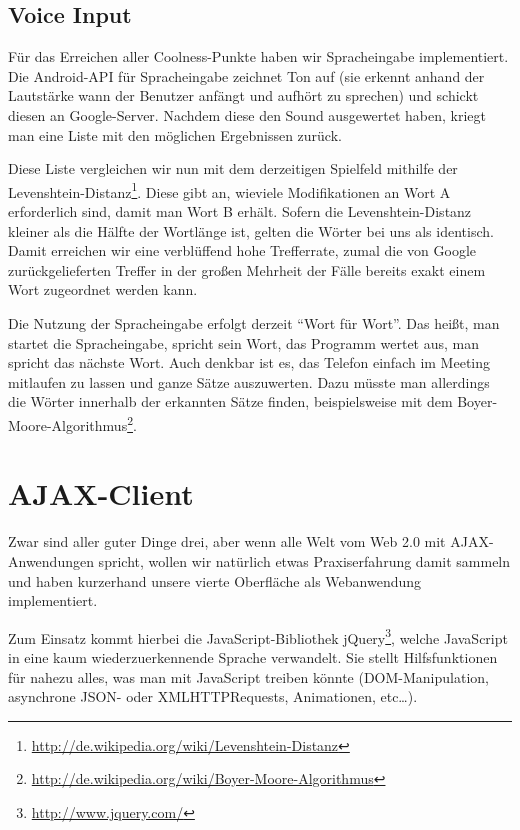 \documentclass[12pt, a4paper]{scrartcl}
\begin{document}
\subsection{Voice Input}

Für das Erreichen aller Coolness-Punkte haben wir Spracheingabe implementiert.
Die Android-API für Spracheingabe zeichnet Ton auf (sie erkennt anhand der
Lautstärke wann der Benutzer anfängt und aufhört zu sprechen) und schickt
diesen an Google-Server. Nachdem diese den Sound ausgewertet haben, kriegt man
eine Liste mit den möglichen Ergebnissen zurück.
\np

Diese Liste vergleichen wir nun mit dem derzeitigen Spielfeld mithilfe der
Levenshtein-Distanz\footnote{\url{http://de.wikipedia.org/wiki/Levenshtein-Distanz}}.
Diese gibt an, wieviele Modifikationen an Wort A erforderlich sind, damit man
Wort B erhält. Sofern die Levenshtein-Distanz kleiner als die Hälfte der
Wortlänge ist, gelten die Wörter bei uns als identisch. Damit erreichen wir
eine verblüffend hohe Trefferrate, zumal die von Google zurückgelieferten
Treffer in der großen Mehrheit der Fälle bereits exakt einem Wort zugeordnet
werden kann.
\np

Die Nutzung der Spracheingabe erfolgt derzeit "`Wort für Wort"'. Das heißt, man
startet die Spracheingabe, spricht sein Wort, das Programm wertet aus, man
spricht das nächste Wort. Auch denkbar ist es, das Telefon einfach im Meeting
mitlaufen zu lassen und ganze Sätze auszuwerten. Dazu müsste man allerdings die
Wörter innerhalb der erkannten Sätze finden, beispielsweise mit dem
Boyer-Moore-Algorithmus\footnote{\url{http://de.wikipedia.org/wiki/Boyer-Moore-Algorithmus}}.

\clearpage
\section{AJAX-Client}

Zwar sind aller guter Dinge drei, aber wenn alle Welt vom Web 2.0 mit
AJAX\--An\-wen\-dung\-en spricht, wollen wir natürlich etwas Praxiserfahrung damit
sammeln und haben kurzerhand unsere vierte Oberfläche als Webanwendung
implementiert.
\np

Zum Einsatz kommt hierbei die JavaScript-Bibliothek
jQuery\footnote{\url{http://www.jquery.com/}}, welche JavaScript in eine kaum
wiederzuerkennende Sprache verwandelt. Sie stellt Hilfsfunktionen für nahezu
alles, was man mit JavaScript treiben könnte (DOM-Manipulation, asynchrone
JSON- oder XMLHTTPRequests, Animationen, etc…).
\np
\end{document}
